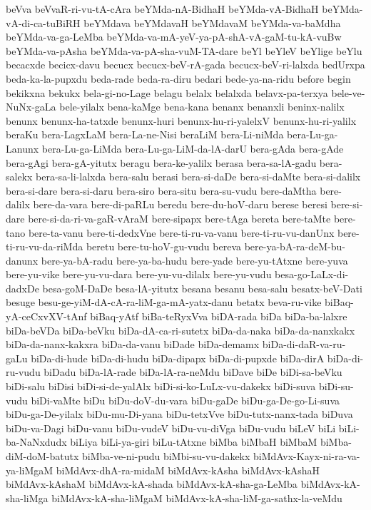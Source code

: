 {beVva
beVvaR-ri-vu-tA-cAra
beYMda-nA-BidhaH
beYMda-vA-BidhaH
beYMda-vA-di-ca-tuBiRH
beYMdava
beYMdavaH
beYMdavaM
beYMda-va-baMdha
beYMda-va-ga-LeMba
beYMda-va-mA-yeV-ya-pA-shA-vA-gaM-tu-kA-vuBw
beYMda-va-pAsha
beYMda-va-pA-sha-vuM-TA-dare
beYl
beYleV
beYlige
beYlu
becacxde
becicx-davu
becucx
becucx-beV-rA-gada
becucx-beV-ri-lalxda
bedUrxpa
beda-ka-la-pupxdu
beda-rade
beda-ra-diru
bedari
bede-ya-na-ridu
before
begin
bekikxna
bekukx
bela-gi-no-Lage
belagu
belalx
belalxda
belavx-pa-terxya
bele-ve-NuNx-gaLa
bele-yilalx
bena-kaMge
bena-kana
benanx
benanxli
beninx-nalilx
benunx
benunx-ha-tatxde
benunx-huri
benunx-hu-ri-yalelxV
benunx-hu-ri-yalilx
beraKu
bera-LagxLaM
bera-La-ne-Nisi
beraLiM
bera-Li-niMda
bera-Lu-ga-Lanunx
bera-Lu-ga-LiMda
bera-Lu-ga-LiM-da-lA-darU
bera-gAda
bera-gAde
bera-gAgi
bera-gA-yitutx
beragu
bera-ke-yalilx
berasa
bera-sa-lA-gadu
bera-salekx
bera-sa-li-lalxda
bera-salu
berasi
bera-si-daDe
bera-si-daMte
bera-si-dalilx
bera-si-dare
bera-si-daru
bera-siro
bera-situ
bera-su-vudu
bere-daMtha
bere-dalilx
bere-da-vara
bere-di-paRLu
beredu
bere-du-hoV-daru
berese
beresi
bere-si-dare
bere-si-da-ri-va-gaR-vAraM
bere-sipapx
bere-tAga
bereta
bere-taMte
bere-tano
bere-ta-vanu
bere-ti-dedxVne
bere-ti-ru-va-vanu
bere-ti-ru-vu-danUnx
bere-ti-ru-vu-da-riMda
beretu
bere-tu-hoV-gu-vudu
bereva
bere-ya-bA-ra-deM-bu-danunx
bere-ya-bA-radu
bere-ya-ba-hudu
bere-yade
bere-yu-tAtxne
bere-yuva
bere-yu-vike
bere-yu-vu-dara
bere-yu-vu-dilalx
bere-yu-vudu
besa-go-LaLx-di-dadxDe
besa-goM-DaDe
besa-lA-yitutx
besana
besanu
besa-salu
besatx-beV-Dati
besuge
besu-ge-yiM-dA-cA-ra-liM-ga-mA-yatx-danu
betatx
beva-ru-vike
biBaq-yA-ceCxvXV-tAnf
biBaq-yAtf
biBa-teRyxVva
biDA-rada
biDa
biDa-ba-lalxre
biDa-beVDa
biDa-beVku
biDa-dA-ca-ri-sutetx
biDa-da-naka
biDa-da-nanxkakx
biDa-da-nanx-kakxra
biDa-da-vanu
biDade
biDa-demamx
biDa-di-daR-va-ru-gaLu
biDa-di-hude
biDa-di-hudu
biDa-dipapx
biDa-di-pupxde
biDa-dirA
biDa-di-ru-vudu
biDadu
biDa-lA-rade
biDa-lA-ra-neMdu
biDave
biDe
biDi-sa-beVku
biDi-salu
biDisi
biDi-si-de-yalAlx
biDi-si-ko-LuLx-vu-dakekx
biDi-suva
biDi-su-vudu
biDi-vaMte
biDu
biDu-doV-du-vara
biDu-gaDe
biDu-ga-De-go-Li-suva
biDu-ga-De-yilalx
biDu-mu-Di-yana
biDu-tetxVve
biDu-tutx-nanx-tada
biDuva
biDu-va-Dagi
biDu-vanu
biDu-vudeV
biDu-vu-diVga
biDu-vudu
biLeV
biLi
biLi-ba-NaNxdudx
biLiya
biLi-ya-giri
biLu-tAtxne
biMba
biMbaH
biMbaM
biMba-diM-doM-batutx
biMba-ve-ni-pudu
biMbi-su-vu-dakekx
biMdAvx-Kayx-ni-ra-va-ya-liMgaM
biMdAvx-dhA-ra-midaM
biMdAvx-kAsha
biMdAvx-kAshaH
biMdAvx-kAshaM
biMdAvx-kA-shada
biMdAvx-kA-sha-ga-LeMba
biMdAvx-kA-sha-liMga
biMdAvx-kA-sha-liMgaM
biMdAvx-kA-sha-liM-ga-sathx-la-veMdu
}

